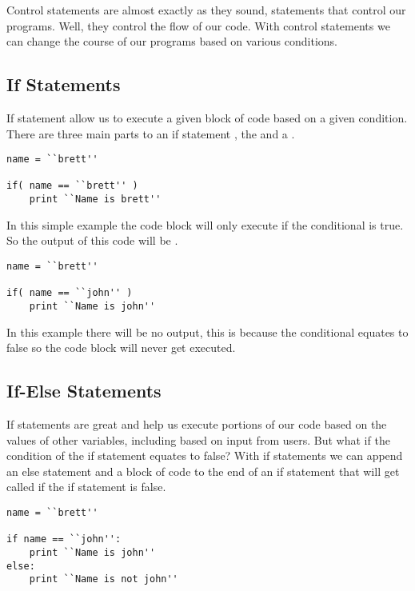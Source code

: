 Control statements are almost exactly as they sound, statements that control our programs.
Well, they control the flow of our code.
With control statements we can change the course of our programs based on various conditions.

\subsection{If Statements}
If statement allow us to execute a given block of code based on a given condition.
There are three main parts to an if statement , the  and a .

\begin{lstlisting}[caption={If Statement}]
name = ``brett''

if( name == ``brett'' )
    print ``Name is brett''
\end{lstlisting}

In this simple example the code block  will only execute if the conditional  is true.
So the output of this code will be .

\begin{lstlisting}[caption={False If Statement}]
name = ``brett''

if( name == ``john'' )
    print ``Name is john''
\end{lstlisting}

In this example there will be no output, this is because the conditional  equates to false so the code block  will never get executed.

\subsection{If-Else Statements}
If statements are great and help us execute portions of our code based on the values of other variables, including based on input from users.
But what if the condition of the if statement equates to false?
With if statements we can append an else statement and a block of code to the end of an if statement that will get called if the if statement is false. 

\begin{lstlisting}[caption={If-Else Statement}]
name = ``brett''

if name == ``john'':
    print ``Name is john''
else:
    print ``Name is not john''
\end{lstlisting}

